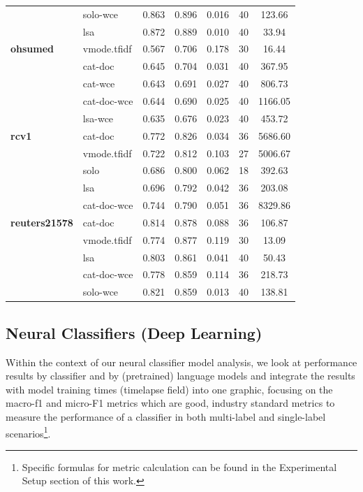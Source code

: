 \documentclass[final]{clv2025-revised}
\begin{document}
\begin{table}[h!]
\begin{tabular}{@{}p{2.2cm} p{2.6cm} c c c c c@{}}
 & solo-wce & 0.863 & 0.896 & 0.016 & 40 & 123.66 \\
 & lsa & 0.872 & 0.889 & 0.010 & 40 & 33.94 \\
\midrule
\textbf{ohsumed} & vmode.tfidf & 0.567 & 0.706 & 0.178 & 30 & 16.44 \\
 & cat-doc & 0.645 & 0.704 & 0.031 & 40 & 367.95 \\
 & cat-wce & 0.643 & 0.691 & 0.027 & 40 & 806.73 \\
 & cat-doc-wce & 0.644 & 0.690 & 0.025 & 40 & 1166.05 \\
 & lsa-wce & 0.635 & 0.676 & 0.023 & 40 & 453.72 \\
\midrule
\textbf{rcv1} & cat-doc & 0.772 & 0.826 & 0.034 & 36 & 5686.60 \\
 & vmode.tfidf & 0.722 & 0.812 & 0.103 & 27 & 5006.67 \\
 & solo & 0.686 & 0.800 & 0.062 & 18 & 392.63 \\
 & lsa & 0.696 & 0.792 & 0.042 & 36 & 203.08 \\
 & cat-doc-wce & 0.744 & 0.790 & 0.051 & 36 & 8329.86 \\
\midrule
\textbf{reuters21578} & cat-doc & 0.814 & 0.878 & 0.088 & 36 & 106.87 \\
 & vmode.tfidf & 0.774 & 0.877 & 0.119 & 30 & 13.09 \\
 & lsa & 0.803 & 0.861 & 0.041 & 40 & 50.43 \\
 & cat-doc-wce & 0.778 & 0.859 & 0.114 & 36 & 218.73 \\
 & solo-wce & 0.821 & 0.859 & 0.013 & 40 & 138.81 \\
\bottomrule
\end{tabular}
\end{table}



\subsection{Neural Classifiers (Deep Learning)}

Within the context of our neural classifier model analysis, we look at performance results by classifier and by (pretrained) language models and integrate the results with model training times (timelapse field) into one graphic, focusing on the macro-f1 and micro-F1 metrics which are good, industry standard metrics to measure the performance of a classifier in both multi-label and single-label scenarios\footnote{Specific formulas for metric calculation can be found in the Experimental Setup section of this work.}.  
\end{document}

